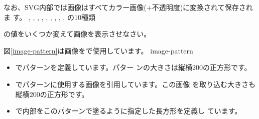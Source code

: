 なお、SVG内部では画像はすべてカラー画像(+不透明度)に変換されて保存されま
す。
{{\noexpand{},
\noexpand{},
\noexpand{},
\noexpand{},
\noexpand{},
\noexpand{},
\noexpand{},
\noexpand{},
\noexpand{},
\noexpand{}の10種類}}
\iffalse\else
\begin{Problem}
 の値をいくつか変えて画像を表示させなさい。
\end{Problem}
図\ref{image-pattern}は画像をで使用しています。
{image-pattern}
\begin{itemize}
 \item {}でパターンを定義しています。パター
       ンの大きさは縦横$200$の正方形です。
 \item {}でパターンに使用する画像を引用しています。この画像
       を取り込む大きさも縦横$200$の正方形です。
 \item {}で内部をこのパターンで塗るように指定した長方形を定義し
       ています。
\end{itemize}
\fi